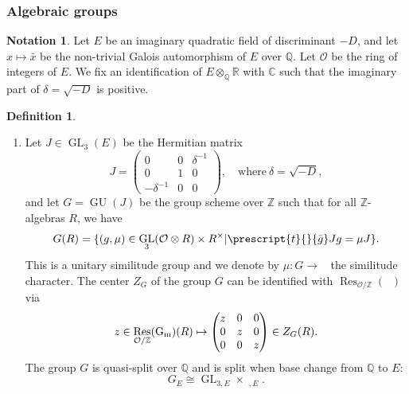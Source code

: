 \documentclass[11pt, a4paper]{amsart}
\theoremstyle{plain}
\theoremstyle{definition}
\newtheorem{definition}[theorem]{Definition}
\newtheorem{notation}[theorem]{Notation}
\numberwithin{equation}{section}
\def\CC{\mathbb{C}}
\def\QQ{\mathbb{Q}}
\def\RR{\mathbb{R}}
\def\ZZ{\mathbb{Z}}
\DeclareMathOperator{\Res}{Res}
\DeclareMathOperator{\GU}{GU}
\DeclareMathOperator{\GL}{\mathrm{GL}}
\DeclareMathOperator{\Gm}{\mathrm{G_{m}}}
\begin{document}
\subsubsection{Algebraic groups}
\begin{notation}
    Let $E$ be an imaginary quadratic field of discriminant $-D$, and let $x \mapsto \bar{x}$ be the non-trivial Galois automorphism of $E$ over $\QQ$. Let $\mathcal{O}$ be the ring of integers of $E$. We fix an identification of $E \otimes_{\QQ} \RR$ with $\CC$ such that the imaginary part of $\delta = \sqrt{-D}$ is positive.
\end{notation}
\begin{definition}
\label{defn:G_H}
\begin{enumerate}
    \item Let $J \in \GL_3(E)$ be the Hermitian matrix 
        \[
            J = \begin{pmatrix} 
                0 & 0 & \delta^{-1} \\
                0 & 1  & 0 \\
                -\delta^{-1} & 0 & 0 
                \end{pmatrix}, \quad \mathrm{where} \ \delta = \sqrt{-D}, 
        \]
        and let $G = \GU(J)$ be the group scheme over $\mathbb{Z}$ such that for all $\mathbb{Z}$-algebras $R$, we have 
        \[
            G(R) = \{(g, \mu) \in \GL_3(\mathcal{O} \otimes R) \times R^{\times} | \prescript{t}{}{\bar{g}}Jg = \mu J\}. 
        \]
        This is a unitary similitude group and we denote by $\mu \colon G \rightarrow \Gm$ the similitude character. The center $Z_{G}$ of the group $G$ can be identified with $\Res_{\mathcal{O}/\ZZ}(\Gm)$ via 
        \begin{equation}
        \label{eq: Z_{G}}
           z \in \Res_{\mathcal{O}/\ZZ}(\Gm)(R) \mapsto  \begin{pmatrix}
                                                            z & 0 & 0 \\
                                                            0 & z & 0 \\
                                                            0 & 0 & z
                                                         \end{pmatrix} \in Z_{G}(R). 
        \end{equation}
        The group $G$ is quasi-split over $\QQ$ and is split when base change from $\QQ$ to $E$: 
        \begin{equation*}
            G_{E} \cong \GL_{3, E} \times \Gm_{,E}. 

\end{equation*}
\end{enumerate}
\end{definition}
\end{document}

